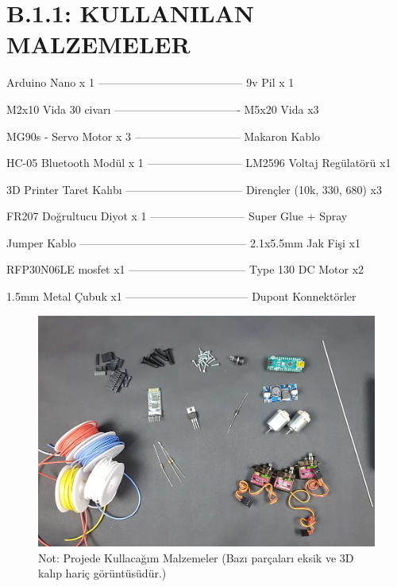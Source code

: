 \clearpage
\section{B.1.1: KULLANILAN MALZEMELER}
\label{CH:AltBolum2.2}

Arduino Nano 		x 1 --------------------------------------- 9v Pil				x 1

M2x10 Vida			 30 civarı	---------------------------------- M5x20 Vida x3

MG90s - Servo Motor	  x 3 ----------------------------- Makaron Kablo

HC-05 Bluetooth Modül 	x 1 -------------------------- LM2596 Voltaj Regülatörü x1

3D Printer Taret Kalıbı -------------------------------- Dirençler (10k, 330, 680) x3

FR207 Doğrultucu Diyot			x 1 -------------------------- Super Glue + Spray

Jumper Kablo --------------------------------------------- 2.1x5.5mm Jak Fişi x1

RFP30N06LE mosfet   x1 -------------------------------- Type 130 DC Motor x2

1.5mm Metal Çubuk x1 --------------------------------- Dupont Konnektörler

\begin{figure}[H]
	\centering
	\includegraphics[width=150mm]{grafik/Malzemeler.png}
    \caption{Not: Projede Kullacağım Malzemeler (Bazı parçaları eksik ve 3D kalıp hariç görüntüsüdür.)}
	\label{fig:MalzemelerDM}
\end{figure}



\clearpage